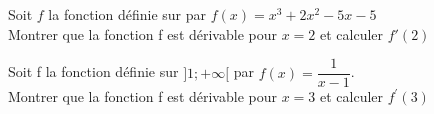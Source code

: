 \documentclass[12pt,a4paper]{article}  %
\begin{document}

Soit $f$ la fonction définie sur \R par $f(x)=x^3+2 x^2-5 x-5$\\
 Montrer que la fonction f est dérivable pour $x=2$ et calculer $f'(2)$

Soit f la fonction définie sur $] 1 ;+\infty[$ par $f(x)=\dfrac{1}{x-1}$.\\
Montrer que la fonction f est dérivable pour $x=3$ et calculer $f^{\prime}(3)$

%
%


\end{document}
